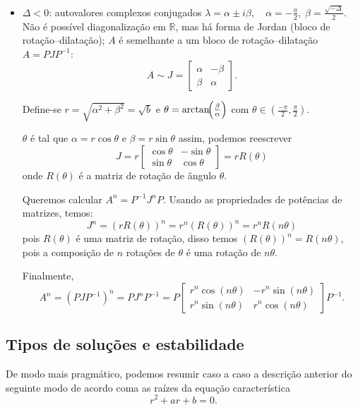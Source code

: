\documentclass{article}
\begin{document}
\begin{itemize}
  
\item \(\displaystyle \Delta<0\): autovalores complexos conjugados
  \(
  \lambda = \alpha \pm i\beta,
  \quad
  \alpha = -\tfrac{a}{2},\;
  \beta = \tfrac{\sqrt{-\Delta}}{2}.
  \) 
  Não é possível diagonalização em $\mathbb R$, mas há forma de Jordan (bloco de rotação–dilatação);  \(A\) é
  semelhante a um bloco de rotação–dilatação \( A = P J P^{-1} \):
  \[
    A \sim J = 
    \begin{bmatrix}
      \alpha  & -\beta \\[3pt]
      \beta   &  \alpha
    \end{bmatrix}.
  \]
  
  Define-se \( r = \sqrt{\alpha^2+\beta^2} = \sqrt{b}\) e
  \( \theta = \arctan\!\Bigl(\frac{\beta}{\alpha}\Bigr) \) com
  \(\theta\in ( \tfrac {-\pi}2 , \tfrac{\pi}2).  \) 
  
  
  \(\theta\) é tal que
  \( \alpha = r \cos\theta \) e \( \beta = r \sin\theta \) assim,
  podemos reescrever 
  \[
    J = r
    \begin{bmatrix}
      \cos\theta & -\sin\theta \\
      \sin\theta & \cos\theta
    \end{bmatrix} = r R(\theta)
  \]
  onde \(R(\theta)\) é a matriz de rotação de ângulo \(\theta\).
  
  Queremos calcular \(A^n = P^{-1} J^n P\).  Usando as propriedades
  de potências de matrizes, temos:
  \[
    J^n = (r R(\theta))^n = r^n (R(\theta))^n = r^n  R(n\theta)
  \]
  pois \(R(\theta)\) é uma matriz de rotação, disso temos
  \( (R(\theta))^n = R(n\theta) \), pois a composição de \(n\)
  rotações de \(\theta\) é uma rotação de \(n\theta\).
  
  Finalmente,
  \[
    A^n = (P J P^{-1})^n = P J^n P^{-1} =  P
    \begin{bmatrix}
      r^n\cos(n\theta) & -r^n\sin(n\theta) \\
      r^n\sin(n\theta) & r^n\cos(n\theta)
    \end{bmatrix}
    P^{-1}.
  \]
  
\end{itemize}
    
\subsection{ Tipos de soluções e estabilidade}

De modo mais pragmático, podemos resumir caso a caso a descrição
anterior do seguinte modo de acordo coma as raízes da equação
característica
\begin{equation*}
r^2 + a r + b = 0.
\end{equation*}
\end{document}
